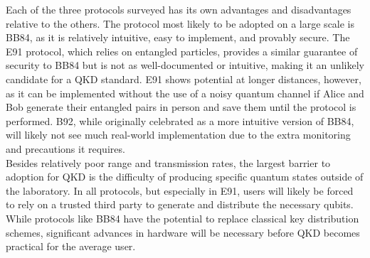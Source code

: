 \documentclass[conference]{IEEEtran}
\begin{document}
Each of the three protocols surveyed has its own advantages and disadvantages relative to the others. The protocol most likely to be adopted on a large scale is BB84, as it is relatively intuitive, easy to implement, and provably secure. The E91 protocol, which relies on entangled particles, provides a similar guarantee of security to BB84 but is not as well-documented or intuitive, making it an unlikely candidate for a QKD standard. E91 shows potential at longer distances, however, as it can be implemented without the use of a noisy quantum channel if Alice and Bob generate their entangled pairs in person and save them until the protocol is performed. B92, while originally celebrated as a more intuitive version of BB84, will likely not see much real-world implementation due to the extra monitoring and precautions it requires.\\

Besides relatively poor range and transmission rates, the largest barrier to adoption for QKD is the difficulty of producing specific quantum states outside of the laboratory. In all protocols, but especially in E91, users will likely be forced to rely on a trusted third party to generate and distribute the necessary qubits. While protocols like BB84 have the potential to replace classical key distribution schemes, significant advances in hardware will be necessary before QKD becomes practical for the average user.\\
\end{document}

